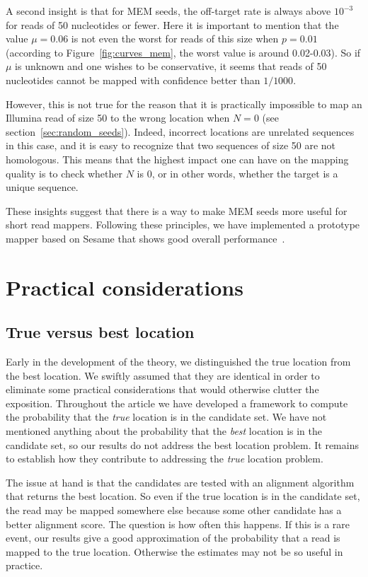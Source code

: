 \documentclass{article}
\begin{document}
A second insight is that for MEM seeds, the off-target rate is always
above $10^{-3}$ for reads of 50 nucleotides or fewer. Here it is important
to mention that the value $\mu=0.06$ is not even the worst for reads of
this size when $p=0.01$ (according to Figure~\ref{fig:curves_mem}, the
worst value is around 0.02-0.03). So if $\mu$ is unknown and one wishes to
be conservative, it seems that reads of 50 nucleotides cannot be mapped
with confidence better than $1/1000$.

However, this is not true for the reason that it is practically impossible
to map an Illumina read of size 50 to the wrong location when $N=0$ (see
section~\ref{sec:random_seeds}). Indeed, incorrect locations are unrelated
sequences in this case, and it is easy to recognize that two sequences of
size 50 are not homologous. This means that the highest impact one can
have on the mapping quality is to check whether $N$ is 0, or in other
words, whether the target is a unique sequence.

These insights suggest that there is a way to make MEM seeds more useful
for short read mappers. Following these principles, we have implemented a
prototype mapper based on Sesame that shows good overall
performance~\cite{zorita2020mapping}.


\section{Practical considerations}
\label{sec_practical}

\subsection{True versus best location}
\label{sec:truevsbest}

Early in the development of the theory, we distinguished the true location
from the best location. We swiftly assumed that they are identical in
order to eliminate some practical considerations that would otherwise
clutter the exposition. Throughout the article we have developed a
framework to compute the probability that the \emph{true} location is in
the candidate set. We have not mentioned anything about the probability
that the \emph{best} location is in the candidate set, so our results do
not address the best location problem. It remains to establish how they
contribute to addressing the \emph{true} location problem.

The issue at hand is that the candidates are tested with an alignment
algorithm that returns the best location. So even if the true location is
in the candidate set, the read may be mapped somewhere else because some
other candidate has a better alignment score. The question is how often
this happens. If this is a rare event, our results give a good
approximation of the probability that a read is mapped to the true
location. Otherwise the estimates may not be so useful in practice.
\end{document}
